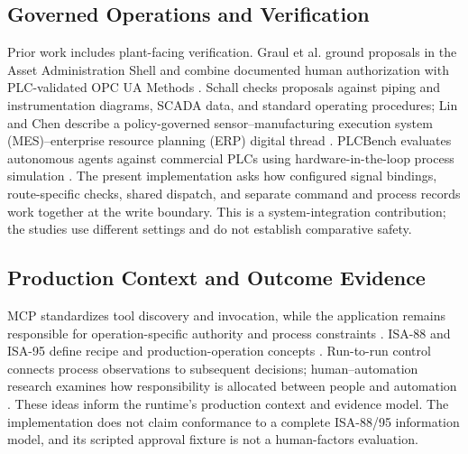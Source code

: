 \subsection{Governed Operations and Verification}
Prior work includes plant-facing verification. Graul et al. ground proposals in the Asset Administration Shell and combine documented human authorization with PLC-validated OPC UA Methods \cite{graul2026aas}. Schall checks proposals against piping and instrumentation diagrams, SCADA data, and standard operating procedures; Lin and Chen describe a policy-governed sensor--manufacturing execution system (MES)--enterprise resource planning (ERP) digital thread \cite{schall2026safe,lin2026agentic}. PLCBench evaluates autonomous agents against commercial PLCs using hardware-in-the-loop process simulation \cite{zhou2026plcbench}. The present implementation asks how configured signal bindings, route-specific checks, shared dispatch, and separate command and process records work together at the write boundary. This is a system-integration contribution; the studies use different settings and do not establish comparative safety.

\subsection{Production Context and Outcome Evidence}
MCP standardizes tool discovery and invocation, while the application remains responsible for operation-specific authority and process constraints \cite{mcp2024}. ISA-88 and ISA-95 define recipe and production-operation concepts \cite{isa88_2010,isa95_2025}. Run-to-run control connects process observations to subsequent decisions; human--automation research examines how responsibility is allocated between people and automation \cite{moyne2000r2r,parasuraman2000model}. These ideas inform the runtime's production context and evidence model. The implementation does not claim conformance to a complete ISA-88/95 information model, and its scripted approval fixture is not a human-factors evaluation.
